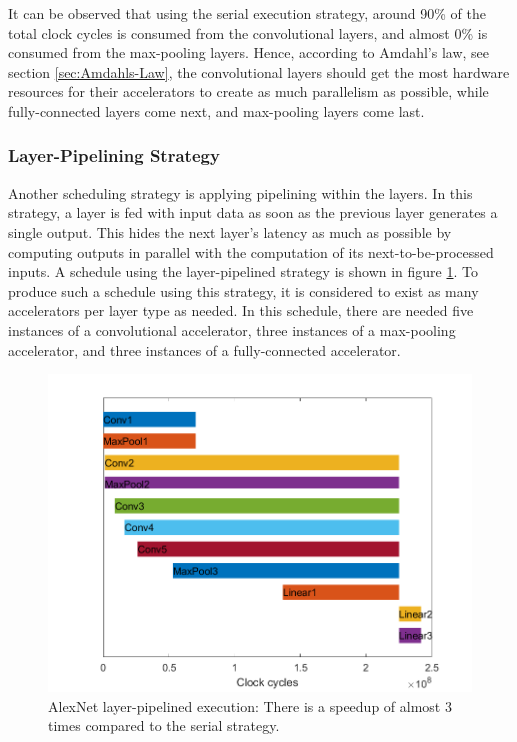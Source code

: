 It can be observed that using the serial execution strategy, around 90\% of the total clock cycles is consumed from the convolutional layers, and almost 0\% is consumed from the max-pooling layers. Hence, according to Amdahl's law, see section \ref{sec:Amdahls-Law}, the convolutional layers should get the most hardware resources for their accelerators to create as much parallelism as possible, while fully-connected layers come next, and max-pooling layers come last.

\subsubsection{Layer-Pipelining Strategy}
Another scheduling strategy is applying pipelining within the layers. In this strategy, a layer is fed with input data as soon as the previous layer generates a single output. This hides the next layer's latency as much as possible by computing outputs in parallel with the computation of its next-to-be-processed inputs. A schedule using the layer-pipelined strategy is shown in figure \ref{fig:layer-pipelined-execution}. To produce such a schedule using this strategy, it is considered to exist as many accelerators per layer type as needed. In this schedule, there are needed five instances of a convolutional accelerator,  three instances of a max-pooling accelerator, and three instances of a fully-connected accelerator.

\begin{figure} [H]
	\centering
	\includegraphics[width=\textwidth]{Images/Scheduling/Pipelined-1x.png}
	\decoRule
	\caption[AlexNet layer-pipelined execution]{AlexNet layer-pipelined execution: There is a speedup of almost 3 times compared to the serial strategy.}
	\label{fig:layer-pipelined-execution}
\end{figure}

